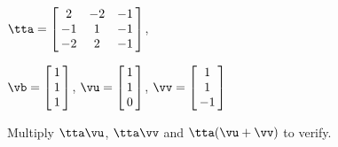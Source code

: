 {$\tta = \left[\hskip -3pt \begin{array}{ccc} 2&-2&-1 \\    -1&1&-1\\    -2&2&-1 \end{array}\hskip -3pt \right] $, 

$\vb=\left[\hskip -3pt \begin{array}{c} 1\\   1 \\    1 \end{array}\hskip -3pt \right] $, 
$\vu = \left[\hskip -3pt \begin{array}{c} 1 \\ 1 \\ 0  \end{array}\hskip -3pt \right]$, 
$\vv = \left[\hskip -3pt \begin{array}{c} 1\\ 1 \\ -1  \end{array}\hskip -3pt \right] $}
{Multiply $\tta\vu$, $\tta\vv$ and $\tta(\vu+\vv)$ to verify.}
